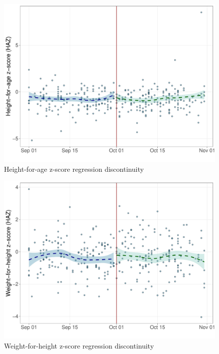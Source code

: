 \documentclass[12pt,a4paper]{article}
\begin{document}
\begin{figure}[H]

{\centering \includegraphics{kayahReport_files/figure-latex/rd3-1} 

}

\caption{Height-for-age z-score regression discontinuity}\label{fig:rd3}
\end{figure}

\begin{figure}[H]

{\centering \includegraphics{kayahReport_files/figure-latex/rd4-1} 

}

\caption{Weight-for-height z-score regression discontinuity}\label{fig:rd4}
\end{figure}
\end{document}
